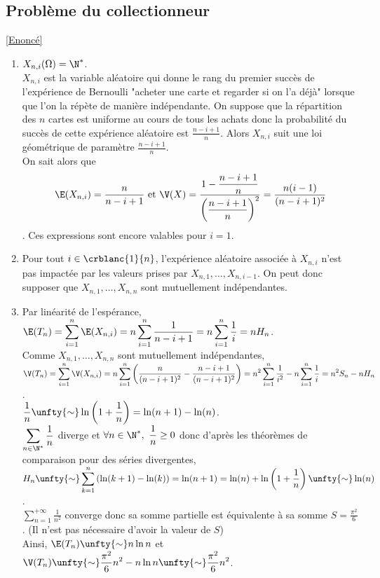\documentclass[8pt]{book}
\begin{document}
	\subsection{Problème du collectionneur }
	\label{Problème du collectionneur corrigé}
		\textcolor{blue}{\hyperref[Problème du collectionneur]{[Enoncé]}}\\
	\begin{enumerate}
		\item $X_{n,i}(\Omega)=\N^*$.\\
		$X_{n,i}$ est la variable aléatoire qui donne le rang du premier succès de l'expérience de Bernoulli "acheter une carte et regarder si on l'a déjà" lorsque que l'on la répète de manière indépendante. On suppose que la répartition des $n$ cartes est uniforme au cours de tous les achats donc la probabilité du succès de cette expérience aléatoire est $\displaystyle\frac{n-i+1}{n}$. Alors $X_{n,i}$ suit une loi géométrique de paramètre $\displaystyle\frac{n-i+1}{n}$.\\ On sait alors que \[\E(X_{n,i})=\displaystyle\frac{n}{n-i+1} \text{ et } \V(X)=\displaystyle\frac{1-\displaystyle\frac{n-i+1}{n}}{\left(\displaystyle\frac{n-i+1}{n}\right)^2}=\frac{n(i-1)}{(n-i+1)^2}\]. Ces expressions sont encore valables pour $i=1$.
		\item Pour tout $i\in \crblanc{1}{n}$, l'expérience aléatoire associée à $X_{n,i}$ n'est pas impactée par les valeurs prises par $X_{n,1},\dots,X_{n,{i-1}}$. On peut donc supposer que $X_{n,1},\dots,X_{n,n}$ sont mutuellement indépendantes.
		\item Par linéarité de l'espérance,\\
		$\E(T_n)=\displaystyle\sum\limits_{i=1}^n\E(X_{n,i})=n\sum\limits_{i=1}^n\frac{1}{n-i+1}=n\sum\limits_{i=1}^{n}\frac{1}{i}=nH_n$.\\
		Comme $X_{n,1},\dots,X_{n,n}$ sont mutuellement indépendantes,\\
		$\V(T_n)=\displaystyle\sum\limits_{i=1}^n\V(X_{n,i})=n\sum\limits_{i=1}^n\left(\frac{n}{(n-i+1)^2}-\frac{n-i+1}{(n-i+1)^2}\right)=n^2\sum\limits_{i=1}^n\frac{1}{i^2}-n\sum\limits_{i=1}^n\frac{1}{i}=n^2S_n-nH_n$.\\
		$\displaystyle\frac{1}{n}\unfty{\sim}\ln\left(1+\frac{1}{n}\right)=\ln(n+1)-\ln(n)$.\\
		$\displaystyle\sum\limits_{n\in \N^*}\frac{1}{n}$ diverge et $\forall n\in \N^*,\ \displaystyle\frac{1}{n}\geq 0$ donc d'après les théorèmes de comparaison pour des séries divergentes,\\
		$H_n\unfty{\sim}\displaystyle\sum\limits_{k=1}^{n}\left(\ln(k+1)-\ln(k)\right)=\ln(n+1)=\ln(n)+\ln\left(1+\frac{1}{n}\right)\unfty{\sim}\ln(n)$.\\
		$\displaystyle\sum\limits_{n=1}^{+\infty}\frac{1}{n^2}$ converge donc sa somme partielle est équivalente à sa somme $S=\displaystyle\frac{\pi^2}{6}$. (Il n'est pas nécessaire d'avoir la valeur de $S$)\\
		Ainsi, $\E(T_n)\unfty{\sim}n\ln n$ et $\V(T_n)\unfty{\sim} \displaystyle\frac{\pi^2}{6}n^2-n\ln n\unfty{\sim}\frac{\pi^2}{6}n^2$.
	\end{enumerate}
	
\end{document}
